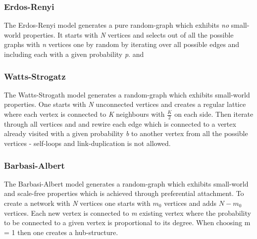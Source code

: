 \documentclass[../Bachelorarbeit.tex]{subfiles}
\begin{document}
\subsubsection{Erdos-Renyi}
The Erdos-Renyi model generates a pure random-graph which exhibits \textit{no} small-world properties. It starts with \textit{N} vertices and selects out of all the possible graphs with \textit{n} vertices one by random by iterating over all possible edges and including each with a given probability \textit{p}. \cite{ErdosRenyi1959} and \cite{ErdosRenyi_EvolutionRandomGraphs}

\subsubsection{Watts-Strogatz}
The Watts-Strogath model generates a random-graph which exhibits small-world properties. One starts with \textit{N} unconnected vertices and creates a regular lattice where each vertex is connected to \textit{K} neighbours with $\frac{K}{2}$ on each side. Then iterate through all vertices and and rewire each edge which is connected to a vertex already visited with a given probability \textit{b} to another vertex from all the possible vertices - self-loops and link-duplication is not allowed. \cite{WattsStrogatz_DynamicsSmallWorld}

\subsubsection{Barbasi-Albert}
The Barbasi-Albert model generates a random-graph which exhibits small-world and scale-free properties which is achieved through preferential attachment. To create a network with \textit{N} vertices one starts with $m_0$ vertices and adds $N - m_0$ vertices. Each new vertex is connected to \textit{m} existing vertex where the probability to be connected to a given vertex is proportional to its degree. When choosing m = 1 then one creates a hub-structure. \cite{BarabasiAlbert_EmergenceScaling}
\end{document}
